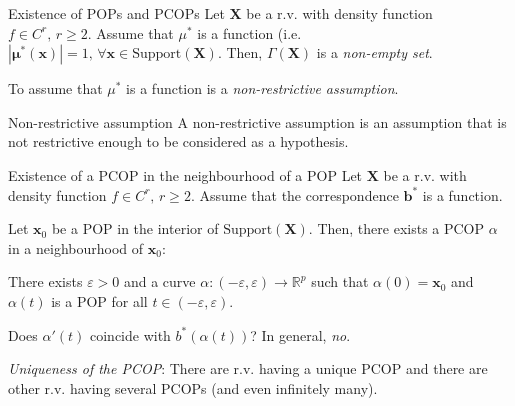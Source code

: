 \begin{theorem}{Existence of POPs and PCOPs}{}
	Let $\boldsymbol X$ be a r.v. with density function $f \in C^r,\, r \geq 2$.
	Assume that $\mu^*$ is a function (i.e. $|\boldsymbol \mu^*(\boldsymbol x)| = 1,\,\forall
		\boldsymbol x \in \text{Support}(\boldsymbol X)$. Then, $\Gamma(\boldsymbol X)$ is a
        \emph{non-empty set}.
	\tcblower
	\begin{note}
        To assume that $\mu^*$ is a function is a \emph{non-restrictive assumption}.
	\end{note}
\end{theorem}

\begin{definition}{Non-restrictive assumption}{}
	A non-restrictive assumption is an assumption that is not restrictive enough to
	be considered as a hypothesis.
\end{definition}

\begin{theorem}{Existence of a PCOP in the neighbourhood of a POP}{}
	Let $\boldsymbol X$ be a r.v. with density function $f \in C^r,\, r \geq 2$.
	Assume that the correspondence $\boldsymbol b^*$ is a function.

	Let $\boldsymbol x_0$ be a POP in the interior of $\text{Support}(\boldsymbol X)$.
	Then, there exists a PCOP $\alpha$ in a neighbourhood of $\boldsymbol x_0$:

	There exists $\varepsilon > 0$ and a curve $\alpha : (-\varepsilon, \varepsilon) \to \mathds{R}^p$
	such that $\alpha(0) = \boldsymbol x_0$ and $\alpha(t)$ is a POP for all $t \in (-\varepsilon, \varepsilon)$.

	\tcblower

	\begin{question}{Does $\alpha'(t)$ coincide with $b^*(\alpha(t))$?}{}
		In general, \emph{no}.
	\end{question}

	\begin{note}
		\emph{Uniqueness of the PCOP}: There are r.v. having a unique PCOP and there
		are other r.v. having several PCOPs (and even infinitely many).
	\end{note}
\end{theorem}


\pagebreak
